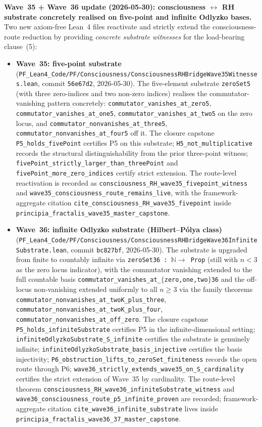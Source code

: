 \medskip\noindent\textbf{Wave~35 + Wave~36 update (2026-05-30): consciousness $\leftrightarrow$ RH substrate concretely realised on five-point and infinite Odlyzko bases.} Two new axiom-free Lean~4 files reactivate and strictly extend the consciousness-route reduction by providing \emph{concrete substrate witnesses} for the load-bearing clause~(5):
\begin{itemize}
  \item \textbf{Wave~35: five-point substrate} (\texttt{PF\_Lean4\_Code/PF/Consciousness/ConsciousnessRHBridgeWave35Witnesses.lean}, commit \texttt{56e67d2}, 2026-05-30). The five-element substrate \texttt{zeroSet5} (with three zero-indices and two non-zero indices) realises the commutator-vanishing pattern concretely: \texttt{commutator\_vanishes\_at\_zero5}, \texttt{commutator\_vanishes\_at\_one5}, \texttt{commutator\_vanishes\_at\_two5} on the zero locus, and \texttt{commutator\_nonvanishes\_at\_three5}, \texttt{commutator\_nonvanishes\_at\_four5} off it. The closure capstone \texttt{P5\_holds\_fivePoint} certifies P5 on this substrate; \texttt{H5\_not\_multiplicative} records the structural distinguishability from the prior three-point witness; \texttt{fivePoint\_strictly\_larger\_than\_threePoint} and \texttt{fivePoint\_more\_zero\_indices} certify strict extension. The route-level reactivation is recorded as \texttt{consciousness\_RH\_wave35\_fivepoint\_witness} and \texttt{wave35\_consciousness\_route\_remains\_live}, with the framework-aggregate citation \texttt{cite\_consciousness\_RH\_wave35\_fivepoint} inside \texttt{principia\_fractalis\_wave35\_master\_capstone}.
  \item \textbf{Wave~36: infinite Odlyzko substrate (Hilbert--Pólya class)} (\texttt{PF\_Lean4\_Code/PF/Consciousness/ConsciousnessRHBridgeWave36InfiniteSubstrate.lean}, commit \texttt{bc827bf}, 2026-05-30). The substrate is upgraded from finite to countably infinite via \texttt{zeroSet36 : $\mathbb{N} \to$ Prop} (still with $n < 3$ as the zero locus indicator), with the commutator vanishing extended to the full countable basis \texttt{commutator\_vanishes\_at\_$\{$zero,one,two$\}$36} and the off-locus non-vanishing extended uniformly to all $n \geq 3$ via the family theorems \texttt{commutator\_nonvanishes\_at\_twoK\_plus\_three}, \texttt{commutator\_nonvanishes\_at\_twoK\_plus\_four}, \texttt{commutator\_nonvanishes\_at\_off\_zero}. The closure capstone \texttt{P5\_holds\_infiniteSubstrate} certifies P5 in the infinite-dimensional setting; \texttt{infiniteOdlyzkoSubstrate\_S\_infinite} certifies the substrate is genuinely infinite; \texttt{infiniteOdlyzkoSubstrate\_basis\_injective} certifies the basis injectivity; \texttt{P6\_obstruction\_lifts\_to\_zeroSet\_finiteness} records the open route through P6; \texttt{wave36\_strictly\_extends\_wave35\_on\_S\_cardinality} certifies the strict extension of Wave~35 by cardinality. The route-level theorem \texttt{consciousness\_RH\_wave36\_infiniteSubstrate\_witness} and \texttt{wave36\_consciousness\_route\_p5\_infinite\_proven} are recorded; framework-aggregate citation \texttt{cite\_wave36\_infinite\_substrate} lives inside \texttt{principia\_fractalis\_wave36\_37\_master\_capstone}.
\end{itemize}
